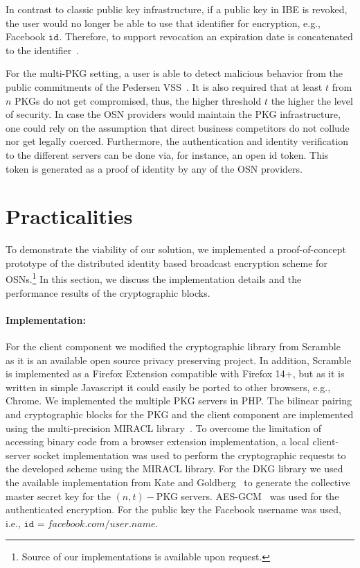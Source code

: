 \documentclass{llncs}
\newcommand{\id}[1]{\ensuremath{\mathtt{id}_{#1}}}
\begin{document}
In contrast to classic public key infrastructure, if a public key in IBE is revoked, the user would no longer be able to use that identifier for encryption, e.g., Facebook \id{}. Therefore, to support revocation an expiration date is concatenated to the identifier~\cite{BonehFranklinIBE}. 

For the multi-PKG setting, a user is able to detect malicious behavior from the public commitments of the Pedersen VSS~\cite{Pedersen:1991:NIS:646756.705507}. It is also required that at least $t$ from $n$ PKGs do not get compromised, thus, the higher threshold $t$ the higher the level of security. In case the OSN providers would maintain the PKG infrastructure, one could rely on the assumption that direct business competitors do not collude nor get legally coerced. Furthermore, the authentication and identity verification to the different servers can be done via, for instance, an open id token. This token is generated as a proof of identity by any of the OSN providers.


\section{Practicalities}\label{sec:impl}
To demonstrate the viability of our solution, we implemented a proof-of-concept prototype of the distributed identity based broadcast encryption scheme for OSNs.\footnote{Source of our implementations is available upon request.} In this section, we discuss the implementation details and the performance results of the cryptographic blocks.

\paragraph{Implementation:}
For the client component we modified the cryptographic library from Scramble~\cite{BeatoScramble} as it is an available open source privacy preserving project. In addition, Scramble is implemented as a Firefox Extension compatible with Firefox 14+, but as it is written in simple Javascript it could easily be ported to other browsers, e.g., Chrome. 
We implemented the multiple PKG servers in PHP.
The bilinear pairing and cryptographic blocks for the PKG and the client component are implemented using the multi-precision {MIRACL} library~\cite{scott2003miracl}. To overcome the limitation of accessing binary code from a browser extension implementation, a local client-server socket implementation was used to perform the cryptographic requests to the developed scheme using the {MIRACL} library.
For the DKG library we used the available implementation from Kate and Goldberg~\cite{DBLP:conf/icdcs/KateG09,dkg-software} to generate the collective master secret key for the $(n,t)-$PKG servers. AES-GCM~\cite{rfc5288} was used for the authenticated encryption. For the public key the Facebook username was used, i.e., $\id{}=facebook.com/user.name$. 
\end{document}
